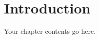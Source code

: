 \documentclass[../../main.tex]{subfiles}
\begin{document}
\chapter*{Introduction}

Your chapter contents go here. 

\end{document}
